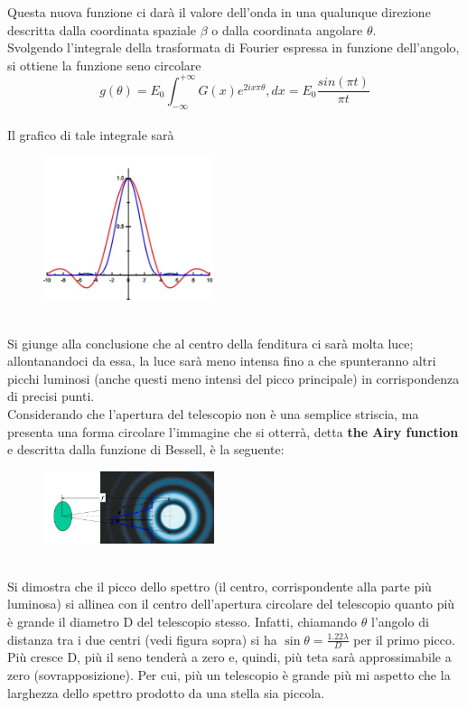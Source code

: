 \documentclass[a4paper,11pt]{article}
\begin{document}
Questa nuova funzione ci darà il valore dell'onda in una qualunque direzione descritta dalla coordinata spaziale \(\beta\) o dalla coordinata angolare \(\theta\).\\
Svolgendo l'integrale della trasformata di Fourier espressa in funzione dell'angolo, si ottiene la funzione seno circolare
\begin{equation*}
    g(\theta) = E_0 \int_{-\infty}^{+\infty} G(x)e^{2ix\pi\theta},dx = E_0 \frac{sin(\pi t)}{\pi t}
\end{equation*}\\
Il grafico di tale integrale sarà 
\begin{figure}[h!!]
    \centering
    \includegraphics[width=5cm]{WhatsApp Image 2023-01-09 at 02.57.58.jpeg}
    \label{fig:my_label9}
\end{figure}\\
Si giunge alla conclusione che al centro della fenditura ci sarà molta luce; allontanandoci da essa, la luce sarà meno intensa fino a che spunteranno altri picchi luminosi (anche questi meno intensi del picco principale) in corrispondenza di precisi punti.\\
Considerando che l'apertura del telescopio non è una semplice striscia, ma presenta una forma circolare l'immagine che si otterrà, detta \textbf{the Airy function} e descritta dalla funzione di Bessell, è la seguente:
\begin{figure}[h!!]
    \centering
    \includegraphics[width=5cm]{WhatsApp Image 2023-01-09 at 02.59.37.jpeg}
    \label{fig:my_label10}
\end{figure}\\
Si dimostra che il picco dello spettro (il centro, corrispondente alla parte più luminosa) si allinea con il centro dell'apertura circolare del telescopio quanto più è grande il diametro D del telescopio stesso. Infatti, chiamando \(\theta\) l'angolo di distanza tra i due centri (vedi figura sopra) si ha \(\sin{\theta} = \frac{1.22\lambda}{D}\) per il primo picco. Più cresce D, più il seno tenderà a zero e, quindi, più teta sarà approssimabile a zero (sovrapposizione). Per cui, più un telescopio è grande più mi aspetto che la larghezza dello spettro prodotto da una stella sia piccola.\\
\end{document}
